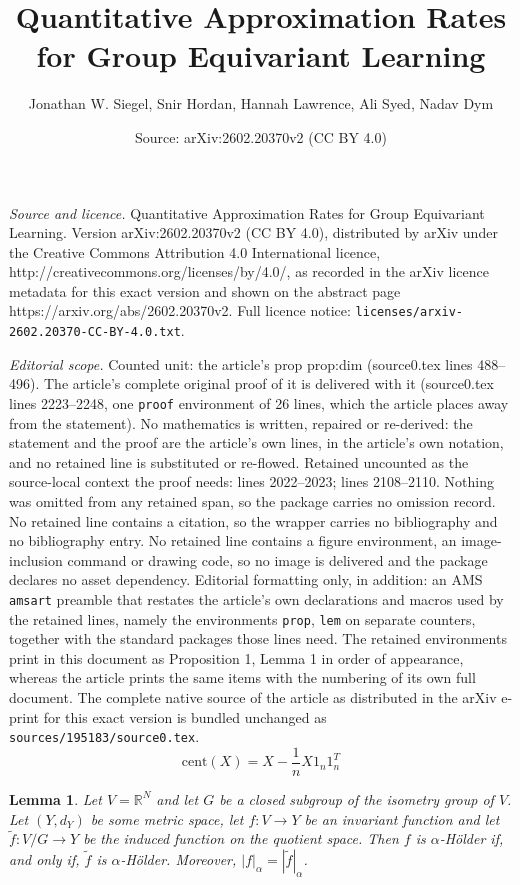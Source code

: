 \documentclass[10pt,a4paper]{amsart}
\title{Quantitative Approximation Rates for Group Equivariant Learning}
\author{Jonathan W. Siegel, Snir Hordan, Hannah Lawrence, Ali Syed, Nadav Dym}
\date{Source: arXiv:2602.20370v2 (CC BY 4.0)}
\newtheorem{lem}{Lemma}
\newcommand{\RR}{\mathbb{R}}
\newcommand{\cent}{\mathrm{cent}}
\begin{document}
\maketitle

\noindent\emph{Source and licence.} Quantitative Approximation Rates for Group Equivariant Learning. Version arXiv:2602.20370v2 (CC BY 4.0), distributed by arXiv under the Creative Commons Attribution 4.0 International licence, http://creativecommons.org/licenses/by/4.0/, as recorded in the arXiv licence metadata for this exact version and shown on the abstract page https://arxiv.org/abs/2602.20370v2. Full licence notice: \texttt{licenses/arxiv-2602.20370-CC-BY-4.0.txt}.\par\smallskip

\noindent\textit{Editorial scope.} Counted unit: the article's prop prop:dim (source0.tex lines 488--496). The article's complete original proof of it is delivered with it (source0.tex lines 2223--2248, one \texttt{proof} environment of 26 lines, which the article places away from the statement). No mathematics is written, repaired or re-derived: the statement and the proof are the article's own lines, in the article's own notation, and no retained line is substituted or re-flowed.  Retained uncounted as the source-local context the proof needs: lines 2022--2023; lines 2108--2110.  Nothing was omitted from any retained span, so the package carries no omission record.  No retained line contains a citation, so the wrapper carries no bibliography and no bibliography entry.  No retained line contains a figure environment, an image-inclusion command or drawing code, so no image is delivered and the package declares no asset dependency.  Editorial formatting only, in addition: an AMS \texttt{amsart} preamble that restates the article's own declarations and macros used by the retained lines, namely the environments \texttt{prop}, \texttt{lem} on separate counters, together with the standard packages those lines need.  The retained environments print in this document as Proposition 1, Lemma 1 in order of appearance, whereas the article prints the same items with the numbering of its own full document.  The complete native source of the article as distributed in the arXiv e-print for this exact version is bundled unchanged as \texttt{sources/195183/source0.tex}.
\begin{equation}\label{eq:cent}
\cent(X)=X-\frac{1}{n}X1_n1_n^T \end{equation}

\begin{lem}\label{lem:holder}
Let $V=\RR^N$ and let $G$ be a closed subgroup of the isometry group of $V$. Let $(Y,d_Y)$ be some metric space,  let $f:V\to Y $ be an invariant function and let $\tilde f:V/G\to Y$ be the induced function on the quotient space. Then $f$ is $\alpha$-H\"older if, and only if, $\tilde f$ is $\alpha$-H\"older. Moreover, $|f|_\alpha=|\tilde f|_\alpha $.
\end{lem}
\end{document}
